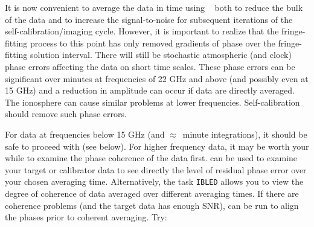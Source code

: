 It is now convenient to average the data in time using {\tt
{}} both to reduce the bulk of the data and to increase the
signal-to-noise for subsequent iterations of the
self-calibration/imaging cycle.  However, it is important to realize
that the fringe-fitting process to this point has only removed
gradients of phase over the fringe-fitting solution interval.  There
will still be stochastic atmospheric (and clock) phase errors
affecting the data on short time scales.  These phase errors can be
significant over minutes at frequencies of 22 GHz and above (and
possibly even at 15 GHz) and a reduction in amplitude can occur if
data are directly averaged.  The ionosphere can cause similar problems
at lower frequencies.  Self-calibration should remove such phase
errors.

For data at frequencies below 15 GHz (and $\approx$\ minute
integrations), it should be safe to proceed with {\tt {}}
(see below).  For higher frequency data, it may be worth your while to
examine the phase coherence of the data first.  {\tt {}} can
be used to examine your target or calibrator data to see directly the
level of residual phase error over your chosen averaging time.
Alternatively, the task {\tt IBLED} allows you to view the degree of
coherence of data averaged over different averaging times.  If there
are coherence problems (and the target data has enough SNR),
{\tt {}} can be run to align the  phases prior to coherent
averaging.  Try:

